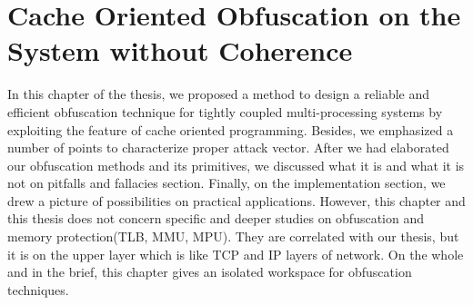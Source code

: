 \chapter{Cache Oriented Obfuscation on the System without Coherence}

In this chapter of the thesis, we proposed a method to design a reliable and efficient obfuscation technique for tightly coupled multi-processing systems by exploiting the feature of cache oriented programming. Besides, we emphasized a number of points to characterize proper attack vector. After we had elaborated our obfuscation methods and its primitives, we discussed what it is and what it is not on pitfalls and fallacies section. Finally, on the implementation section, we drew a picture of possibilities on practical applications. However, this chapter and this thesis does not concern specific and deeper studies on obfuscation and memory protection(TLB, MMU, MPU). They are correlated with our thesis, but it is on the upper layer which is like TCP and IP layers of network. On the whole and in the brief, this chapter gives an isolated workspace for obfuscation techniques.

